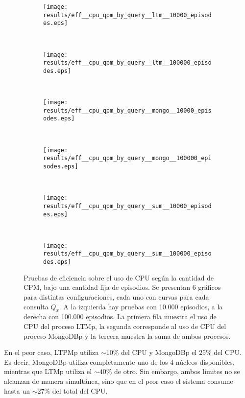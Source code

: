 \begin{figure}[!ht]
	\centering
	\begin{subfigure}[b]{0.45\textwidth}
		\texttt{[image: results/eff\_\_cpu\_qpm\_by\_query\_\_ltm\_\_10000\_episodes.eps]}
		\caption{}
		\label{result:eff__cpu_qpm_by_query__ltm__10k_episodes}
	\end{subfigure}
	~
	\begin{subfigure}[b]{0.45\textwidth}
		\texttt{[image: results/eff\_\_cpu\_qpm\_by\_query\_\_ltm\_\_100000\_episodes.eps]}
		\caption{}
		\label{result:eff__cpu_qpm_by_query__ltm__100k_episodes}
	\end{subfigure}
	~
	\begin{subfigure}[b]{0.45\textwidth}
		\texttt{[image: results/eff\_\_cpu\_qpm\_by\_query\_\_mongo\_\_10000\_episodes.eps]}
		\caption{}
		\label{result:eff__cpu_qpm_by_query__mongo__10k_episodes}
	\end{subfigure}
	~
	\begin{subfigure}[b]{0.45\textwidth}
		\texttt{[image: results/eff\_\_cpu\_qpm\_by\_query\_\_mongo\_\_100000\_episodes.eps]}
		\caption{}
		\label{result:eff__cpu_qpm_by_query__mongo__100k_episodes}
	\end{subfigure}
	~
	\begin{subfigure}[b]{0.45\textwidth}
		\texttt{[image: results/eff\_\_cpu\_qpm\_by\_query\_\_sum\_\_10000\_episodes.eps]}
		\caption{}
		\label{result:eff__cpu_qpm_by_query__sum__10k_episodes}
	\end{subfigure}
	~
	\begin{subfigure}[b]{0.45\textwidth}
		\texttt{[image: results/eff\_\_cpu\_qpm\_by\_query\_\_sum\_\_100000\_episodes.eps]}
		\caption{}
		\label{result:eff__cpu_qpm_by_query__sum__100k_episodes}
	\end{subfigure}
	\caption[Eficiencia: Uso de CPU según CPM bajo cantidad fija de episodios.]
	{\small Pruebas de eficiencia sobre el uso de CPU según la cantidad de CPM, bajo una cantidad fija de episodios. Se presentan 6 gráficos para distintas configuraciones, cada uno con curvas para cada consulta $Q_x$. A la izquierda hay pruebas con 10.000 episodios, a la derecha con 100.000 episodios. La primera fila muestra el uso de CPU del proceso LTMp, la segunda corresponde al uso de CPU del proceso MongoDBp y la tercera muestra la suma de ambos procesos.}
	\label{result:eff__cpu_qpm_by_query}
\end{figure}

En el peor caso, LTPMp utiliza $\sim10\%$ del CPU y MongoDBp el $25\%$ del CPU. Es decir, MongoDBp utiliza completamente uno de los 4 núcleos disponibles, mientras que LTMp utiliza el $\sim40\%$ de otro. Sin embargo, ambos límites no se alcanzan de manera simultánea, sino que en el peor caso el sistema consume hasta un $\sim27\%$ del total del CPU. 

